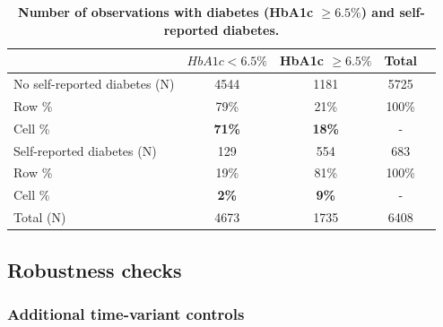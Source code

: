 \documentclass[12pt,english]{article}
\begin{document}
\clearpage

\begin{table}[!ht]
	\caption{\label{tab:Biomarker_observations}{\bf Number of observations with diabetes (HbA1c $\geq 6.5\%$) and self-reported diabetes.}}
	\begin{center}
		\begin{adjustbox}{max width=\linewidth}
			\begin{threeparttable}
				{
					\def\sym#1{\ifmmode^{#1}\else\(^{#1}\)\fi}
					\begin{tabular}{lcccc}
						\toprule
						&\multicolumn{1}{c}{$HbA1c < 6.5\%$}&\multicolumn{1}{c}{HbA1c $\geq 6.5\%$}&\multicolumn{1}{c}{Total}\\
						\midrule
						No self-reported diabetes (N) & 4544 & 1181 & 5725 &  \\
						\hspace*{10mm}Row  \% & 79\% & 21\% & 100\% &  \\
						\hspace*{10mm}Cell \% & \textbf{71\%} & \textbf{18\%} & - & \\
						Self-reported diabetes (N) & 129 & 554 & 683 &  \\
						\hspace*{10mm}Row \%  & 19\% & 81\% & 100\% &  \\
						\hspace*{10mm}Cell \% & \textbf{2\%} &\textbf{9\%} &- & \\
						Total (N) & 4673 & 1735 & 6408 &  \\ 
						\bottomrule
					\end{tabular}
					\begin{tablenotes}
						\item
					\end{tablenotes}
				}
			\end{threeparttable}
		\end{adjustbox}
	\end{center}
\end{table}


\clearpage

\subsection*{Robustness checks}

\subsubsection*{Additional time-variant controls}
\end{document}
